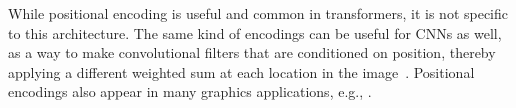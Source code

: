 While positional encoding is useful and common in transformers, it is not specific to this architecture. The same kind of encodings can be useful for CNNs as well, as a way to make convolutional filters that are conditioned on position, thereby applying a different weighted sum at each location in the image~\cite{liu2018intriguing}. Positional encodings also appear in many graphics applications, e.g., \cite{mildenhall2020nerf}.


